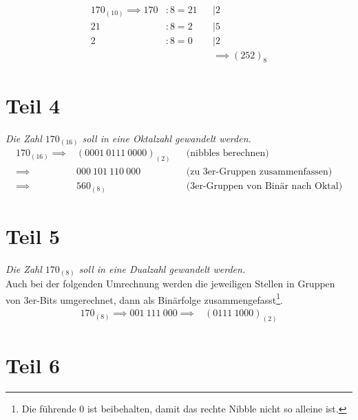 \begin{equation}
    \begin{alignat}{3}
        170_{(10)}  \implies 170 &  : 8  = 21 && | 2\\
        21 & : 8  = 2 && | 5 \\
        2 & : 8  = 0 && | 2 \\
        & && \implies (252)_{8}
    \end{alignat}
\end{equation}

\section{Teil 4}


\textit{Die Zahl $170_{(16)}$ soll in eine Oktalzahl gewandelt werden.}\\

\begin{equation}
    \begin{alignat}{3}
        170_{(16)}  \implies &  (0001 \ 0111 \ 0000)_{(2)} && \text{(nibbles berechnen)} \\
                    \implies &  000 \ 101 \ 110 \ 000 && \text{(zu 3er-Gruppen zusammenfassen)} \\
                    \implies &  560_{(8)} && \text{(3er-Gruppen von Binär nach Oktal)}
    \end{alignat}
\end{equation}

\section{Teil 5}


\textit{Die Zahl $170_{(8)}$ soll in eine Dualzahl gewandelt werden.}\\

\noindent
Auch bei der folgenden Umrechnung werden die jeweiligen Stellen in Gruppen von 3er-Bits umgerechnet, dann als Binärfolge zusammengefasst\footnote{
    Die führende $0$ ist beibehalten, damit das rechte Nibble nicht so alleine ist.
}.\\


\begin{equation}
    \begin{alignat}{3}
        170_{(8)}  \implies 001 \ 111 \ 000 \implies &  (0111\ 1000)_{(2)}
    \end{alignat}
\end{equation}

\section{Teil 6}


